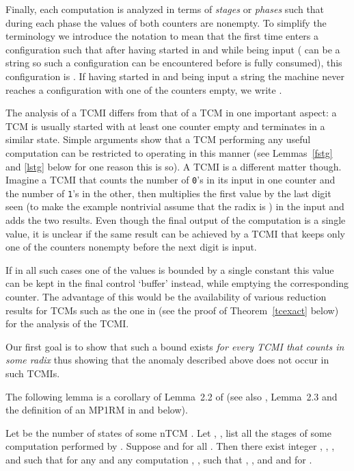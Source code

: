 \documentclass[12pt]{article}
\begin{document}
Finally, each computation is analyzed in terms of {\it stages\/} or
{\it phases\/} such that during each phase the values of both counters
are nonempty. To simplify the terminology we introduce the notation
 to mean that the first time  enters
a configuration  such that  after having
started in  and while being input  ( can be a
string so such a configuration can be encountered before  is fully
consumed), this configuration is . If
having started in  and being input a string  the machine never reaches a
configuration with one of the counters empty, we write . 

The analysis of a TCMI differs from that of a TCM in one important
aspect: a TCM is usually started with at least one counter empty and
terminates in a similar state. Simple arguments show that a TCM
performing any useful computation can be restricted to operating in
this manner (see Lemmas~\ref{fstg} and \ref{lstg} below for one
reason this is so). A TCMI is a different matter though. Imagine a
TCMI that counts the number of {\tt 0}'s in its input in one counter and the number
of {\tt 1}'s in the other, then multiplies the first value by the
last digit seen (to make the example nontrivial assume that the radix
is ) in the input and adds the two results. 
Even though the final output of the computation
is a single value, it is 
unclear if the same result can be achieved by a TCMI that keeps only
one of the counters nonempty before the next digit is input. 

If in all such cases
one of the values is bounded by a single constant this value can be
kept in the final control `buffer' instead, while emptying the
corresponding counter. The advantage of this would be the availability 
of various reduction results for TCMs such as the one in
\cite{Schroep} (see the proof of Theorem~\ref{tcexact} below)
for the analysis of the TCMI.

Our first goal is to show that such a bound exists {\it for every TCMI that
counts in some radix } thus showing that the anomaly
described above does not occur in such TCMIs.

The following lemma is a corollary of Lemma~2.2 of \cite{ibarra} (see
also \cite{ibarra}, Lemma~2.3 and the definition of an MP1RM in \cite{Schroep} and below).
\begin{lemma}\label{linper}
Let  be the number of states of some nTCM . Let , ,  list all the stages of some computation
performed by . Suppose  and  for all . 
Then there exist integer , , , and  such that for any
 and any computation , ,  such that , , and   and  for .
\end{lemma}
\end{document}
